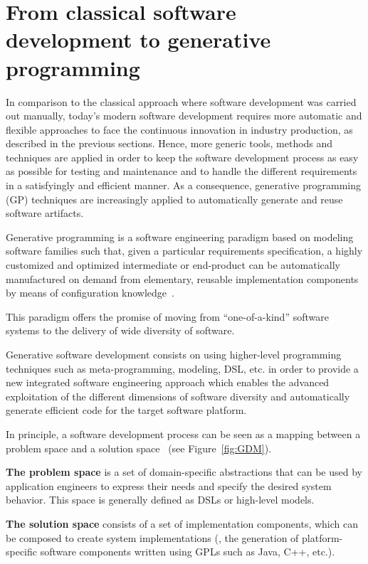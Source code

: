 \section{From classical software development to generative programming}
\label{sec:FROM} 
In comparison to the classical approach where software development was carried out manually, today’s modern software development requires more automatic and flexible approaches to face the continuous innovation in industry production, as described in the previous sections.
Hence, more generic tools, methods and techniques are applied in order to keep the software development process as easy as possible for testing and maintenance and to handle the different requirements in a satisfyingly and efficient manner.
As a consequence, generative programming (GP) techniques are increasingly applied to automatically generate and reuse software artifacts.
\begin{mydef}
		Generative programming is a software engineering paradigm based on modeling software families such that, given a particular requirements specification, a highly customized and optimized intermediate or end-product can be automatically manufactured on demand from elementary, reusable implementation components by means of configuration knowledge~\cite{Czarnecki:2000:GPM:345203}.
\end{mydef}

This paradigm offers the promise of moving from ``one-of-a-kind'' software systems to the  delivery of wide diversity of software.

Generative software development consists on using higher-level programming techniques such as meta-programming, modeling, DSL, etc. in order to provide a new integrated software engineering approach which enables the advanced exploitation of the different dimensions of software diversity and automatically generate efficient code for the target software platform. 

In principle, a software development process can be seen as a mapping between a problem space and a solution space~\cite{czarnecki2005overview} (see Figure~\ref{fig:GDM}). 

\textbf{The problem space} is a set of domain-specific abstractions that can be used by application engineers to express their needs and specify the desired system behavior. This space is generally defined  as DSLs or high-level models. 

\textbf{The solution space} consists of a set of implementation components, which can be composed to create system implementations (\eg, the generation of platform-specific software components written using GPLs such as Java, C++, etc.).

